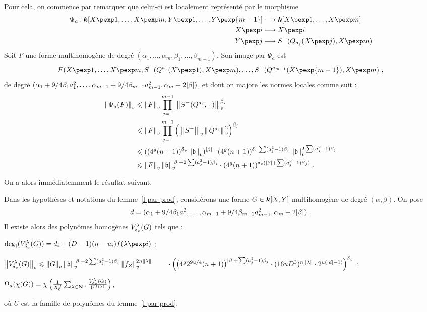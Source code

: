 Pour cela, on commence par remarquer que celui-ci est localement
représenté par le morphisme
 \begin{align*}
   \Psi_a \colon \cdn[X\pexp1, \ldots, X\pexp m, Y\pexp1, \ldots, Y\pexp{m-1}]
   & \longrightarrow \cdn[X\pexp1, \ldots, X\pexp m] \\
   X\pexp i & \longmapsto X\pexp i \\
   Y\pexp j & \longmapsto S^-(Q_{a_j}(X\pexp j), X\pexp m) \\
 \end{align*}
Soit $F$ une forme multihomogène de degré $(\alpha_1, \ldots, \alpha_m,
\beta_1, \ldots, \beta_{m-1})$. Son image par $\Psi_a$ est
\[
  F(X\pexp1, \ldots, X\pexp m, S^-(Q^{a_1}(X\pexp 1), X\pexp m), \ldots,
  S^-(Q^{a_{m-1}}(X\pexp{m-1}), X\pexp m) \pmm,
\]
de degré $(\alpha_1 + 9/4 \beta_1 a_1^2, \ldots, \alpha_{m-1} + 9/4
\beta_{m-1} a_{m-1}^2, \alpha_m +2{\lvert\beta\rvert})$, et dont on majore les normes
locales comme suit :
\begin{align*}
  \left\lVert\Psi_a(F)\right\rVert_{v}
  & \leqslant \left\lVert F\right\rVert_{v} \prod_{j=1}^{m-1} \left\lvert\hspace{-1pt}\left\lvert\hspace{-1pt} \left\lvert S^-(Q^{a_j}, {\,\cdot\,})\right\rvert \hspace{-1pt}\right\rvert\hspace{-1pt}\right\rvert_{v}^{\beta_j} \\
  & \leqslant \left\lVert F\right\rVert_{v} \prod_{j=1}^{m-1} \left( \left\lvert\hspace{-1pt}\left\lvert\hspace{-1pt} \left\lvert S^-\right\rvert \hspace{-1pt}\right\rvert\hspace{-1pt}\right\rvert_{v} \left\lvert\hspace{-1pt}\left\lvert\hspace{-1pt} \left\lvert Q^{a_j}\right\rvert \hspace{-1pt}\right\rvert\hspace{-1pt}\right\rvert_{v}^2
    \right)^{\beta_j} \\
  & \leqslant ((4^g(n+1))^{\delta\smash{_v}} \left\lVert\mathfrak b\right\rVert_{v})^{{\lvert\beta\rvert}} \cdot (4^g(n+1))^{{\delta\smash{_v}}\sum(a_j^2
      -1)\beta_j} \left\lVert\mathfrak b\right\rVert_{v}^{2\sum(a_j^2-1)\beta_j} \\
  & \leqslant \left\lVert F\right\rVert_{v} \left\lVert\mathfrak b\right\rVert_{v}^{{\lvert\beta\rvert} + 2\sum(a_j^2-1)\beta_j} \cdot
    (4^g(n+1))^{{\delta\smash{_v}}({\lvert\beta\rvert} + \sum(a_j^2-1)\beta_j)} \text{ .}
\end{align*}

On a alors immédiatemment le résultat suivant.

\begin{lem} \label{l-param-fin}
  Dans les hypothèses et notations du lemme~\ref{l-par-prod}, considérons une
  forme $G \in \boldsymbol{k}[X, Y]$ multihomogène de degré $(\alpha, \beta)$. On pose
  \[ d = (\alpha_1 + 9/4 \beta_1 a_1^2, \ldots,
  \alpha_{m-1} + 9/4 \beta_{m-1} a_{m-1}^2, \alpha_m +2{\lvert\beta\rvert}) \text{ .} \]
  Il existe alors des polynômes homogènes $V^\lambda_{\delta\smash{_v}}(G)$ tels que :
  \begin{enumthm}
    \item $\deg_i(V_\dv^\lambda(G)) = d_i + (D-1)(n-u_i)f(\lambda\pexp i)$ ;
    \item $\nv{V_\dv^\lambda(G)} \le \nv G \nv\BA ^{\lgr\beta + 2\sum
      (a_j^2-1)\beta_j} \nv{f_Z}^{2n\lgt\lambda} \\ \null\qquad \cdot
      \Big( \big(4^g 2^{9u/4}(n+1)\big)^{\lgr\beta + \sum(a_j^2-1)\beta_j}
      \cdot (16uD^3)^{n\lgt\lambda} \cdot 2^{u(\lgr d -1)}
      \Big)^\dv$ ;
    \item $\Omega_a(\chi(G)) =\chi \left( \frac1{X_0^d} \sum_{\lambda \in \mathbf{N}^u}
      \frac {V_{\delta\smash{_v}}^\lambda(G)} {U^{f(\lambda)}} \right)$,
  \end{enumthm}
  où $U$ est la famille de polynômes du lemme~\ref{l-par-prod}.
\end{lem}

